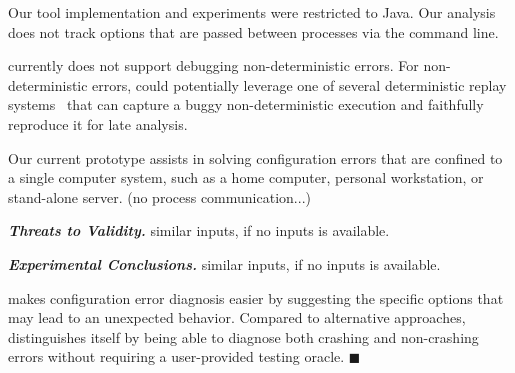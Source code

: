 Our tool implementation and experiments were restricted to Java. Our analysis
does not track options that are passed between processes via the command line.

\ourtool currently does not support debugging non-deterministic errors. %
For non-deterministic errors, \ourtool could potentially leverage one of
several deterministic replay systems~\cite{Huang:2010:LLD}
that can capture a buggy non-deterministic
execution and faithfully reproduce it for late analysis.

Our current \ourtool prototype assists in solving configuration errors that are confined
to a single computer system, such as a home computer, personal workstation, or stand-alone server. (no process communication...)

\vspace{1mm}

\noindent \textbf{\textit{Threats to Validity.}} similar inputs, if no inputs is available.

\vspace{1mm}

\noindent \textbf{\textit{Experimental Conclusions.}} similar inputs, if no inputs is available.

\ourtool makes configuration error diagnosis easier by suggesting
the specific options that may lead to an unexpected behavior. Compared to
alternative approaches, \ourtool distinguishes itself by being able to
diagnose both crashing and non-crashing errors without requiring
a user-provided testing oracle. $\blacksquare$
